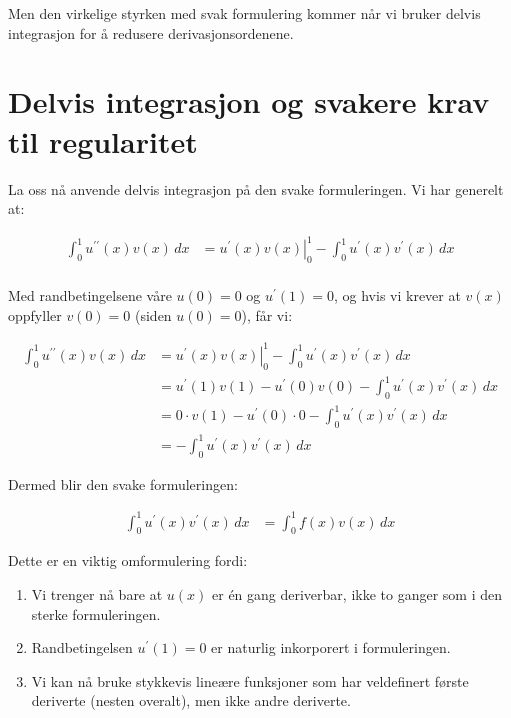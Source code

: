 Men den virkelige styrken med svak formulering kommer når vi bruker delvis integrasjon for å redusere derivasjonsordenene.

\section{Delvis integrasjon og svakere krav til regularitet}

La oss nå anvende delvis integrasjon på den svake formuleringen. Vi har generelt at:

\begin{align*}
  \int_0^1 u^{\prime\prime}(x) v(x) \, dx &= \left. u^{\prime}(x) v(x) \right|_{0}^{1} - \int_0^1 u^{\prime}(x) v^{\prime}(x) \, dx \\
\end{align*}

Med randbetingelsene våre $u(0) = 0$ og $u^{\prime}(1) = 0$, og hvis vi krever at $v(x)$ oppfyller $v(0) = 0$ (siden $u(0) = 0$), får vi:

\begin{align*}
  \int_0^1 u^{\prime\prime}(x) v(x) \, dx &= \left. u^{\prime}(x) v(x) \right|_{0}^{1} - \int_0^1 u^{\prime}(x) v^{\prime}(x) \, dx \\
  &= u^{\prime}(1) v(1) - u^{\prime}(0) v(0) - \int_0^1 u^{\prime}(x) v^{\prime}(x) \, dx \\
  &= 0 \cdot v(1) - u^{\prime}(0) \cdot 0 - \int_0^1 u^{\prime}(x) v^{\prime}(x) \, dx \\
  &= - \int_0^1 u^{\prime}(x) v^{\prime}(x) \, dx
\end{align*}

Dermed blir den svake formuleringen:

\begin{align*}
  \int_0^1 u^{\prime}(x) v^{\prime}(x) \, dx &= \int_0^1 f(x) v(x) \, dx
\end{align*}

Dette er en viktig omformulering fordi:

\begin{enumerate}
  \item Vi trenger nå bare at $u(x)$ er én gang deriverbar, ikke to ganger som i den sterke formuleringen.
  \item Randbetingelsen $u^{\prime}(1) = 0$ er naturlig inkorporert i formuleringen.
  \item Vi kan nå bruke stykkevis lineære funksjoner som har veldefinert første deriverte (nesten overalt), men ikke andre deriverte.
\end{enumerate}

